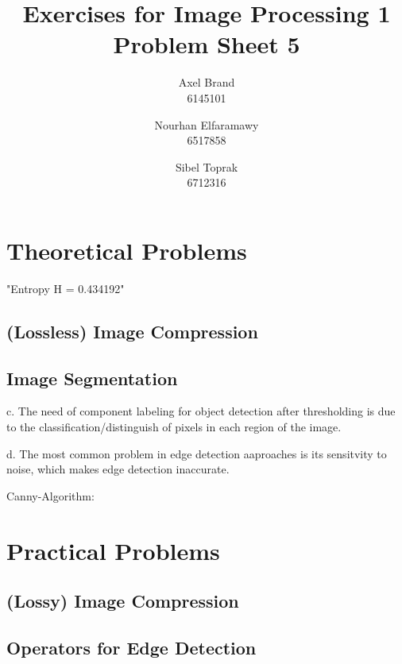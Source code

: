 \documentclass[a4paper,twocolumn]{article}
\title{\textbf{Exercises for Image Processing 1}\\Problem Sheet 5}
\author{Axel Brand\\6145101 \and Nourhan Elfaramawy\\6517858 \and Sibel Toprak\\6712316}
\begin{document}
	\maketitle
	
	\section{Theoretical Problems}
	"Entropy H = 0.434192"
	

	
	\subsection{(Lossless) Image Compression}
	
	\subsection{Image Segmentation}
	
	c. The need of component labeling for object detection after thresholding is due to the classification/distinguish of pixels in each region of the image.
	
	d. The most common problem in edge detection aaproaches is its sensitvity to noise, which makes edge detection inaccurate.
	
	Canny-Algorithm:
	
	
	\section{Practical Problems}
	
	\subsection{(Lossy) Image Compression}
	
	\subsection{Operators for Edge Detection}
	
\end{document}
